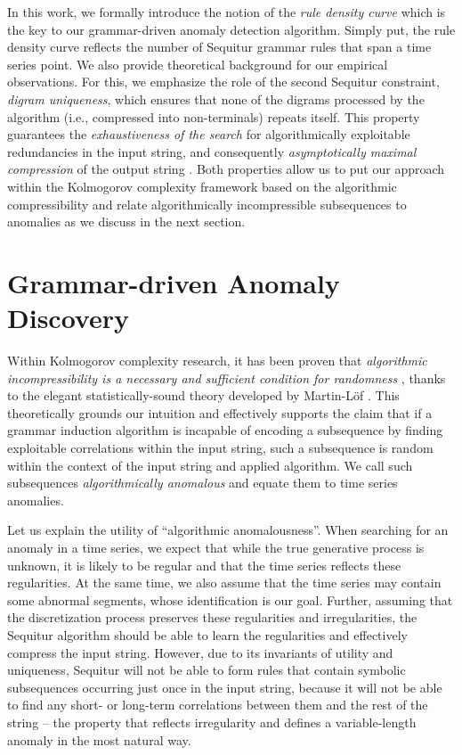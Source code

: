 \documentclass{sig-alternate}
\begin{document}
In this work, we formally introduce the notion of the \textit{rule density curve} which is the key to our grammar-driven anomaly detection algorithm. Simply put, the rule density curve reflects the number of Sequitur grammar rules that span a time series point. We also provide theoretical background for our empirical observations. For this, we emphasize the role of the second Sequitur constraint, \textit{digram uniqueness}, which ensures that none of the digrams processed by the algorithm (i.e., compressed into non-terminals) repeats itself.  This property guarantees the \textit{exhaustiveness of the search} for algorithmically exploitable redundancies in the input string, and consequently \textit{asymptotically maximal compression} of the output string \cite{compression}. Both properties allow us to put our approach within the Kolmogorov complexity framework based on the  algorithmic compressibility and relate algorithmically incompressible subsequences to anomalies as we discuss in the next section.

\section{Grammar-driven Anomaly\\ Discovery}\label{algorithms}
Within Kolmogorov complexity research, it has been proven that \textit{algorithmic incompressibility is a necessary and sufficient condition for randomness} \cite{grigorieff, li_vitanyi}, thanks to the elegant statistically-sound theory developed by Martin-L\"{o}f \cite{per_lof}. This theoretically grounds our intuition and effectively supports the claim that if a grammar induction algorithm is incapable of encoding a subsequence by finding exploitable correlations within the input string, such a subsequence is random within the context of the input string and applied algorithm. We call such subsequences \textit{algorithmically anomalous} and equate them to time series anomalies.  

Let us explain the utility of ``algorithmic anomalousness''. When searching for an anomaly in a time series, we expect that while the true generative process is unknown, it is likely to be regular and that the time series reflects these regularities. At the same time, we also assume that the time series may contain some abnormal segments, whose identification is our goal. Further, assuming that the discretization process preserves these regularities and irregularities, the Sequitur algorithm should be able to learn the regularities and effectively compress the input string. However, due to its invariants of utility and uniqueness, Sequitur will not be able to form rules that contain symbolic subsequences occurring just once in the input string, because it will not be able to find any short- or long-term correlations between them and the rest of the string -- the property that reflects irregularity and defines a variable-length anomaly in the most natural way. 
\end{document}
